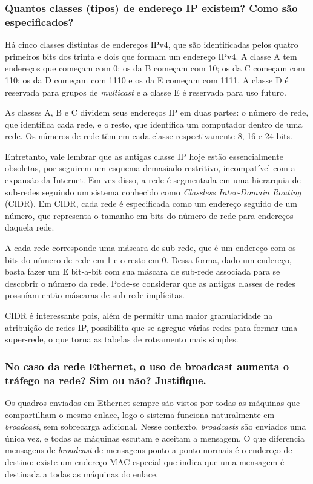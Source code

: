 \subsubsection*{Quantos classes (tipos) de endereço IP existem? Como
  são especificados?}

Há cinco classes distintas de endereços IPv4, que são identificadas
pelos quatro primeiros bits dos trinta e dois que formam um endereço
IPv4. A classe A tem endereços que começam com 0; os da B começam com
10; os da C começam com 110; os da D começam com 1110 e os da E
começam com 1111. A classe D é reservada para grupos de
\emph{multicast} e a classe E é reservada para uso futuro. 

As classes A, B e C dividem seus endereços IP em duas partes: o número
de rede, que identifica cada rede, e o resto, que identifica um
computador dentro de uma rede. Os números de rede têm em cada classe
respectivamente 8, 16 e 24 bits.

Entretanto, vale lembrar que as antigas classe IP hoje estão
essencialmente obsoletas, por seguirem um esquema demasiado
restritivo, incompatível com a expansão da Internet. Em vez disso, a
rede é segmentada em uma hierarquia de sub-redes seguindo um sistema
conhecido como \emph{Classless Inter-Domain Routing} (CIDR). Em CIDR,
cada rede é especificada como um endereço seguido de um número, que
representa o tamanho em bits do número de rede para endereços daquela
rede.

A cada rede corresponde uma máscara de sub-rede, que é um endereço com
os bits do número de rede em 1 e o resto em 0. Dessa forma, dado um
endereço, basta fazer um E bit-a-bit com sua máscara de sub-rede
associada para se descobrir o número da rede. Pode-se considerar que
as antigas classes de redes possuíam então máscaras de sub-rede
implícitas.

CIDR é interessante pois, além de permitir uma maior granularidade na
atribuição de redes IP, possibilita que se agregue várias redes para
formar uma super-rede, o que torna as tabelas de roteamento mais simples.

\subsubsection*{No caso da rede Ethernet, o uso de broadcast aumenta o
  tráfego na rede? Sim ou não? Justifique.}

Os quadros enviados em Ethernet sempre são vistos por todas as
máquinas que compartilham o mesmo enlace, logo o sistema funciona
naturalmente em \emph{broadcast}, sem sobrecarga adicional. Nesse
contexto, \emph{broadcasts} são enviados uma única vez, e todas as
máquinas escutam e aceitam a mensagem. O que diferencia mensagens de
\emph{broadcast} de mensagens ponto-a-ponto normais é o endereço de
destino: existe um endereço MAC especial que indica que uma mensagem é
destinada a todas as máquinas do enlace.

